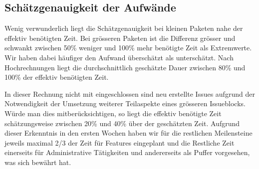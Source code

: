	\subsection{Schätzgenauigkeit der Aufwände}
	Wenig verwunderlich liegt die Schätzgenauigkeit bei kleinen Paketen nahe der effektiv benötigten Zeit.
	Bei grösseren Paketen ist die Differenz grösser und schwankt zwischen 50\% weniger und 100\% mehr benötigte Zeit als Extremwerte.
	Wir haben dabei häufiger den Aufwand überschätzt als unterschätzt.
	Nach Hochrechnungen liegt die durchschnittlich geschätzte Dauer zwischen 80\% und 100\% der effektiv benötigten Zeit.
	
	In dieser Rechnung nicht mit eingeschlossen sind neu erstellte Issues aufgrund der Notwendigkeit der Umsetzung weiterer Teilaspekte eines grösseren Issueblocks.
	Würde man dies mitberücksichtigen, so liegt die effektiv benötigte Zeit schätzungsweise zwischen 20\% und 40\% über der geschätzten Zeit.
	Aufgrund dieser Erkenntnis in den ersten Wochen haben wir für die restlichen Meilensteine jeweils maximal 2/3 der Zeit für Features eingeplant
	und die Restliche Zeit einerseits für Administrative Tätigkeiten und andererseits als Puffer vorgesehen, was sich bewährt hat. 
